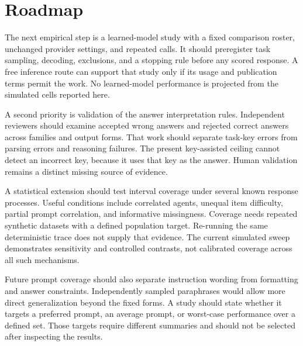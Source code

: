 \documentclass{article}
\begin{document}
\section{Roadmap}
The next empirical step is a learned-model study with a fixed comparison roster, unchanged provider settings, and repeated calls. It should preregister task sampling, decoding, exclusions, and a stopping rule before any scored response. A free inference route can support that study only if its usage and publication terms permit the work. No learned-model performance is projected from the simulated cells reported here.\par
A second priority is validation of the answer interpretation rules. Independent reviewers should examine accepted wrong answers and rejected correct answers across families and output forms. That work should separate task-key errors from parsing errors and reasoning failures. The present key-assisted ceiling cannot detect an incorrect key, because it uses that key as the answer. Human validation remains a distinct missing source of evidence.\par
A statistical extension should test interval coverage under several known response processes. Useful conditions include correlated agents, unequal item difficulty, partial prompt correlation, and informative missingness. Coverage needs repeated synthetic datasets with a defined population target. Re-running the same deterministic trace does not supply that evidence. The current simulated sweep demonstrates sensitivity and controlled contrasts, not calibrated coverage across all such mechanisms.\par
Future prompt coverage should also separate instruction wording from formatting and answer constraints. Independently sampled paraphrases would allow more direct generalization beyond the fixed forms. A study should state whether it targets a preferred prompt, an average prompt, or worst-case performance over a defined set. Those targets require different summaries and should not be selected after inspecting the results.\par
\end{document}
